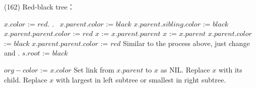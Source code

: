 \item \begin{theorem}{(162)} Red-black tree： 
    \begin{algorithm}[H]
        \begin{algorithmic}[1]
                \State $x.color$ := $red$.
                \State {}.\
                            \State $x.parent.color$ := $black$
                            \State $x.parent.sibling.color$ := $black$
                            \State $x.parent.parent.color$ := $red$
                            \State $x$ := $x.parent.parent$
                            \State $x$ := $x.parent$
                            \State {}
                        \Else
                            \State $x.parent.color$ := $black$
                            \State $x.parent.parent.color$ := $red$
                            \State {}
                        \EndIf
                    \Else
                        \State Similar to the process above, just change  and .
                    \EndIf
                \EndWhile
                \State $s.root$ := $black$
            \EndFunction
        \end{algorithmic}
    \end{algorithm}
    \begin{algorithm}[H]
        \begin{algorithmic}[1]
                \State $org-color$ := $x.color$
                    \State Set link from $x.parent$ to $x$ as NIL.
                \ElsIf {$x$ has $1$ child}
                    \State Replace $x$ with its child. 
                \Else {}
                    \State Replace $x$ with largest in left subtree or smallest in right subtree.
                \EndIf
                    \State {}
                \EndIf
            \EndFunction
        \end{algorithmic}
    \end{algorithm}
    \begin{algorithm}[H]

\end{algorithm}
\end{theorem}
